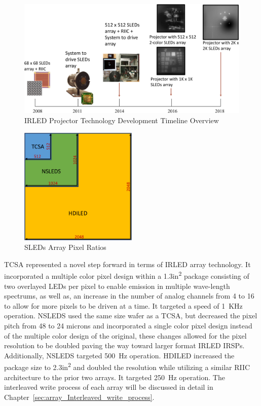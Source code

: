 \begin{figure}
    \centering
    \includegraphics[width=1.0\textwidth]{fig/sleds_timeline.pdf}
    \caption{IRLED Projector Technology Development Timeline Overview}
    \label{fig:sleds_timeline}
\end{figure}

\begin{figure}
    \centering
    \includegraphics[width=0.5\textwidth]{fig/tcsa_nsleds_hdiled_array_ratio.pdf}
    \caption{SLEDs Array Pixel Ratios}
    \label{fig:tcsa_nsleds_hdiled_array_ratio}
\end{figure}

TCSA represented a novel step forward in terms of IRLED array technology. It incorporated a multiple color pixel design within a 1.3in\textsuperscript{2} package consisting of two overlayed LEDs per pixel to enable emission in multiple wave-length spectrums, as well as, an increase in the number of analog channels from 4 to 16 to allow for more pixels to be driven at a time. It targeted a speed of \mbox{1 KHz} operation. NSLEDS used the same size wafer as a TCSA, but decreased the pixel pitch from 48 to 24 microns and incorporated a single color pixel design instead of the multiple color design of the original, these changes allowed for the pixel resolution to be doubled paving the way toward larger format IRLED IRSPs. Additionally, NSLEDS targeted \mbox{500 Hz} operation. HDILED increased the package size to 2.3in\textsuperscript{2} and doubled the resolution while utilizing a similar RIIC architecture to the prior two arrays. It targeted \mbox{250 Hz} operation. The interleaved write process of each array will be discussed in detail in Chapter~\ref{sec:array_Interleaved_write_process}.

